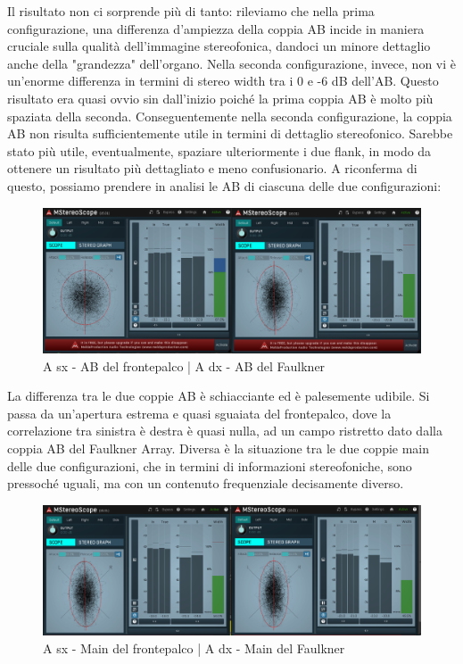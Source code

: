 \documentclass{article}
\begin{document}
    Il risultato non ci sorprende più di tanto: rileviamo che nella prima configurazione, una differenza d'ampiezza della coppia AB incide in maniera cruciale sulla qualità dell'immagine stereofonica, dandoci un minore dettaglio anche della "grandezza" dell'organo. Nella seconda configurazione, invece, non vi è un'enorme differenza in termini di stereo width tra i 0 e -6 dB dell'AB. Questo risultato era quasi ovvio sin dall'inizio poiché la prima coppia AB è molto più spaziata della seconda. Conseguentemente nella seconda configurazione, la coppia AB non risulta sufficientemente utile in termini di dettaglio stereofonico. Sarebbe stato più utile, eventualmente, spaziare ulteriormente i due flank, in modo da ottenere un risultato più dettagliato e meno confusionario.
    A riconferma di questo, possiamo prendere in analisi le AB di ciascuna delle due configurazioni:
    
    \begin{figure}[H]
        \centering
        \includegraphics[width=1\textwidth]{images/4PLOT-AB.png}
         \caption{\label{fig11}A sx - AB del frontepalco | A dx - AB del Faulkner}
    \end{figure}
    
    La differenza tra le due coppie AB è schiacciante ed è palesemente udibile. Si passa da un'apertura estrema e quasi sguaiata del frontepalco, dove la correlazione tra sinistra è destra è quasi nulla, ad un campo ristretto dato dalla coppia AB del Faulkner Array.
    Diversa è la situazione tra le due coppie main delle due configurazioni, che in termini di informazioni stereofoniche, sono pressoché uguali, ma con un contenuto frequenziale decisamente diverso.
    
    \begin{figure}[H]
        \centering
        \includegraphics[width=1\textwidth]{images/4PLOT-MAIN.png}
         \caption{\label{fig11}A sx - Main del frontepalco | A dx - Main del Faulkner}
    \end{figure}
\endsubsection
\end{document}
